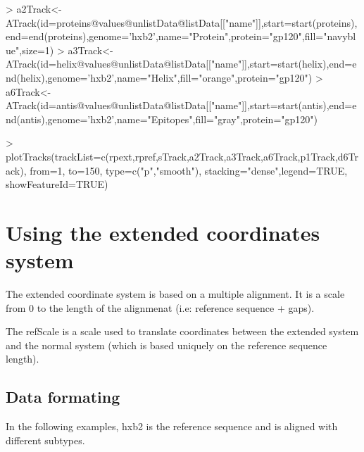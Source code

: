 \documentclass[11pt]{article}
\begin{document}
\begin{Schunk}
\begin{Sinput}
> a2Track<-ATrack(id=proteins@values@unlistData@listData[["name"]],start=start(proteins),end=end(proteins),genome='hxb2',name="Protein",protein="gp120",fill="navyblue",size=1)
> a3Track<-ATrack(id=helix@values@unlistData@listData[["name"]],start=start(helix),end=end(helix),genome='hxb2',name="Helix",fill="orange",protein="gp120")
> a6Track<-ATrack(id=antis@values@unlistData@listData[["name"]],start=start(antis),end=end(antis),genome='hxb2',name="Epitopes",fill="gray",protein="gp120")
\end{Sinput}
\end{Schunk}

\begin{Schunk}
\end{Schunk}

\begin{Schunk}
\begin{Sinput}
> plotTracks(trackList=c(rpext,rpref,sTrack,a2Track,a3Track,a6Track,p1Track,d6Track), from=1, to=150, type=c("p","smooth"), stacking="dense",legend=TRUE, showFeatureId=TRUE)
\end{Sinput}
\end{Schunk}

\section{Using the extended coordinates system}

The extended coordinate system is based on a multiple alignment. It is a scale from 0 to the length of the alignmenat (i.e: reference sequence + gaps).

The refScale is a scale used to translate coordinates between the extended system and the normal system (which is based uniquely on the reference sequence length).

\subsection{Data formating}
In the following examples, hxb2 is the reference sequence and is aligned with different subtypes.
\end{document}
